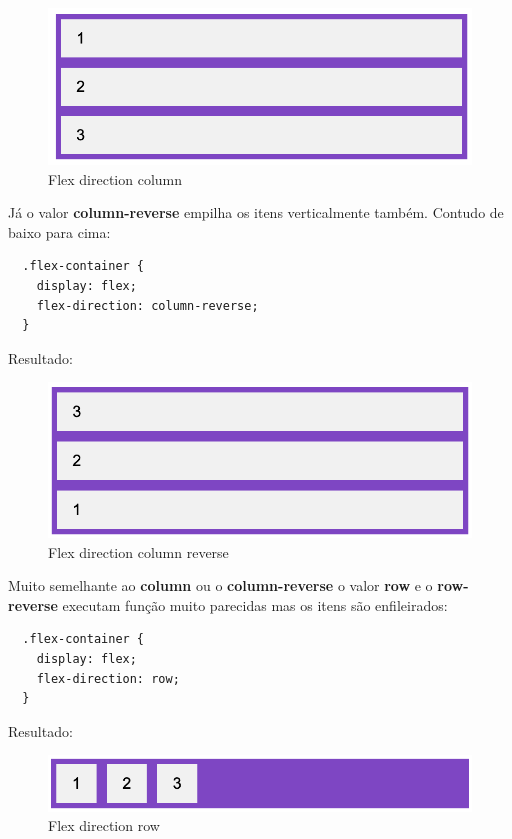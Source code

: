 \begin{figure}[H]
  \centering
  \includegraphics[scale=0.4]{imagens/flex-direction-column.png}
  \caption{Flex direction column}
  \label{fig:flex-direction-column}
\end{figure}

Já o valor \textbf{column-reverse} empilha os itens verticalmente também. Contudo de baixo para cima:

\begin{lstlisting}
  .flex-container {
    display: flex;
    flex-direction: column-reverse;
  } 
\end{lstlisting}

Resultado: 

\begin{figure}[H]
  \centering
  \includegraphics[scale=0.4]{imagens/flex-direction-column-reverse.png}
  \caption{Flex direction column reverse}
  \label{fig:model-flexbox}
\end{figure}

Muito semelhante ao \textbf{column} ou o \textbf{column-reverse} o valor \textbf{row} e o \textbf{row-reverse} executam função muito parecidas mas os itens são enfileirados:

\begin{lstlisting}
  .flex-container {
    display: flex;
    flex-direction: row;
  } 
\end{lstlisting}

Resultado: 

\begin{figure}[H]
  \centering
  \includegraphics[scale=0.4]{imagens/flex-direction-row.png}
  \caption{Flex direction row}
  \label{fig:model-flexbox}
\end{figure}

